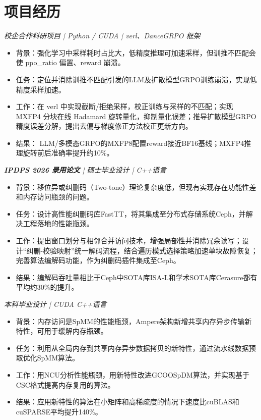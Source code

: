 \section{项目经历}
\textit{校企合作科研项目 | Python / CUDA | verl、DanceGRPO 框架}
\begin{itemize}
\item 背景：强化学习中采样耗时占比大，低精度推理可加速采样，但训推不匹配会使 ppo\_ratio 偏置、reward 崩溃。
\item 任务：定位并消除训推不匹配引发的LLM及扩散模型GRPO训练崩溃，实现低精度采样加速。
\item 工作：在 verl 中实现截断/拒绝采样，校正训练与采样的不匹配；实现 MXFP4 分块在线 Hadamard 旋转量化，抑制量化误差；推导扩散模型GRPO精度误差分解，提出去偏与梯度修正方法校正更新方向。
\item 结果： LLM/多模态GRPO的MXFP8配置reward接近BF16基线；MXFP4推理旋转前后准确率提升约10\%。
\end{itemize}
\textit{\textbf{IPDPS 2026 录用论文} | 硕士毕业设计 | C++语言}
\begin{itemize}
\item 背景：移位异或纠删码（Two-tone）理论复杂度低，但现有实现存在功能性差和内存访问瓶颈的问题。
\item 任务：设计高性能纠删码库FastTT，将其集成至分布式存储系统Ceph，并解决工程落地的性能瓶颈。
\item 工作：提出窗口划分与相邻合并访问技术，增强局部性并消除冗余读写；设计“纠删-校验映射”统一解码流程，结合遍历模式选择策略加速单块故障恢复；完善算法编解码功能，作为纠删码插件集成至Ceph。
\item 结果：编解码吞吐量相比于Ceph中SOTA库ISA-L和学术SOTA库Cerasure都有平均约30\%的提升。
\end{itemize}
\textit{本科毕业设计 | CUDA C++语言}
\begin{itemize}
  \item 背景：内存访问是SpMM的性能瓶颈，Ampere架构新增共享内存异步传输新特性，可用于缓解内存瓶颈。
  \item 任务：利用从全局内存到共享内存异步数据拷贝的新特性，通过流水线数据预取优化SpMM算法。
  \item 工作：用NCU分析性能瓶颈，用新特性改进GCOOSpDM算法，并实现基于CSC格式提高内存复用的算法。
  \item 结果：应用新特性的算法在小矩阵和高稀疏度的情况下速度比cuBLAS和cuSPARSE平均提升140\%。
\end{itemize}
